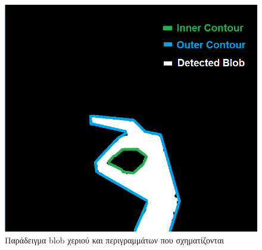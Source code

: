 \begin{figure}[H]
    \centering
    \includegraphics[scale=0.7, angle=0]{Files/Figures/2.png}
    \caption[Παράδειγμα blob χεριού και περιγραμμάτων που σχηματίζονται]{Παράδειγμα blob χεριού και περιγραμμάτων που σχηματίζονται}
    \label{fig:gesture_rec}
\end{figure}



